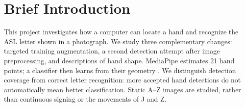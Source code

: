 \documentclass{article}
\begin{document}

{}





\section{Brief Introduction}

This project investigates how a computer can locate a hand and recognize the ASL letter shown in a photograph. We study three complementary changes: targeted training augmentation, a second detection attempt after image preprocessing, and descriptions of hand shape. MediaPipe estimates 21 hand points; a classifier then learns from their geometry \citep{ton-zhang2020,ton-shin2021}. We distinguish detection coverage from correct letter recognition: more accepted hand detections do not automatically mean better classification. Static A--Z images are studied, rather than continuous signing or the movements of J and Z.
\end{document}
